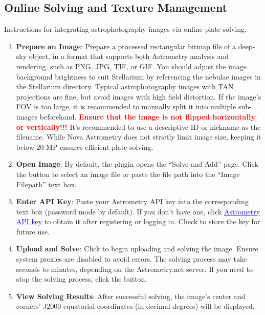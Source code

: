 \subsection{Online Solving and Texture Management}
Instructions for integrating astrophotography images via online plate solving.
\begin{enumerate}
    \item \textbf{Prepare an Image}: Prepare a processed rectangular bitmap file of a deep-sky object, 
	in a format that supports both Astrometry analysis and rendering, such as PNG, JPG, TIF, or GIF. 
	You should adjust the image background brightness to suit Stellarium 
	by referencing the nebulae images in the Stellarium  directory. Typical 
	astrophotography images with TAN projections are fine, but avoid images with high field distortion. 
	If the image's FOV is too large, it is recommended to manually split it into multiple sub-images beforehand. 
	\textbf{\textcolor{red}{Ensure that the image is not flipped horizontally or vertically!!!}} 
	It’s recommended to use a descriptive ID or nickname as the filename. 
	While Nova Astrometry does not strictly limit image size, keeping it below 20 MP 
	ensures efficient plate solving.

    \item \textbf{Open Image}: By default, the plugin opens the ``Solve and Add'' page. Click the  
	button to select an image file or paste the file path into the ``Image Filepath'' text box.

    \item \textbf{Enter API Key}: Paste your Astrometry API key into the corresponding text box (password 
	mode by default). If you don’t have one, click \href{https://nova.astrometry.net/api_help}{\textcolor{blue}{\underline{Astrometry API key}}} to obtain it 
	after registering or logging in. Check  to store the key for future use.

    \item \textbf{Upload and Solve}: Click  to begin uploading and solving the image. Ensure system 
	proxies are disabled to avoid errors. The solving process may take seconds to minutes, 
	depending on the Astrometry.net server. If you need to stop the solving process, click the  button.

    \item \textbf{View Solving Results}: After successful solving, the image's center and corners' J2000 
	equatorial coordinates (in decimal degrees) will be displayed.


\end{enumerate}
